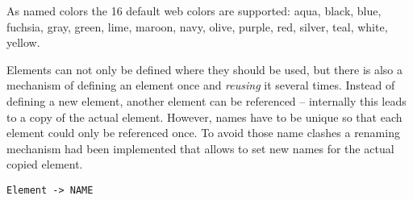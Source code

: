 As named colors the 16 default web colors are supported: aqua, black, blue, fuchsia, gray, green, lime, maroon, navy, olive, purple, red, silver, teal, white, yellow.

Elements can not only be defined where they should be used, but there is also a mechanism of defining an element once and \textit{reusing} it several times. Instead of defining a new element, another element can be referenced -- internally this leads to a copy of the actual element. However, names have to be unique so that each element could only be referenced once. To avoid those name clashes a renaming mechanism had been implemented that allows to set new names for the actual copied element.
\begin{lstlisting}
Element -> NAME
\end{lstlisting}
